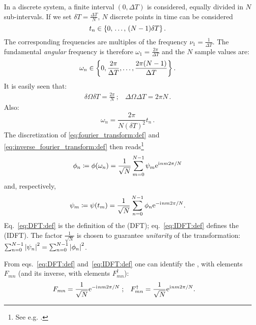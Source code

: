 In a discrete system, a finite interval $(0, \Delta{T})$ is considered,
equally divided in $N$ sub-intervals. If we set $\delta{T} = \frac{\Delta{T}}{N}$,
$N$ discrete points in time can be considered
\begin{equation}\label{eq:DFT:t_spectrum}
  t_n \in \left\{0,\,\hdots,\,(N-1)\delta{T}\right\} \text{.}
\end{equation}
%
The corresponding frequencies are multiples of the  frequency $\nu_1 = \frac{1}{\Delta{T}}$.
The fundamental \emph{angular} frequency is therefore $\omega_1 = \frac{2\pi}{\Delta{T}}$ and the
$N$ sample values are:
\begin{equation}\label{eq:DFT:omega_spectrum}
  \omega_n \in \left\{0, \frac{2\pi}{\Delta{T}}, \dots, \frac{2\pi(N-1)}{\Delta{T}}\right\} \text{.}
\end{equation}
%
It is easily seen that:
\begin{gather}\label{eq:DFT:deltas}
  \delta\Omega \delta T = \frac{2\pi}{N} \, \text{;} \quad
  \Delta\Omega \Delta T = 2\pi N \, \text{.}
\end{gather}
Also:
\begin{equation}\label{eq:DFT:eigenratio}
  \omega_{n} = \frac{2\pi}{N(\delta{T})^{2}} t_{n}  \, \text{.}
\end{equation}
%
The discretization
of \eqref{eq:fourier_transform:def} and \eqref{eq:inverse_fourier_transform:def}
then reads\footnote{
  See e.g.
  \cite{Oppenheim:Int1,Oppenheim:Int3,ProakisManolakis}.
}
\begin{equation}\label{eq:DFT:def}
  \phi_n \coloneqq \phi(\omega_n) = \frac{1}{\sqrt{N}} \sum_{m=0}^{N-1} \psi_m \mathrm{e}^{\mathrm{i}\mkern1mu n m 2 \pi / N}
\end{equation}
and, respectively,
\begin{equation}\label{eq:IDFT:def}
  \psi_m \coloneqq \psi(t_m) = \frac{1}{\sqrt{N}} \sum_{n=0}^{N-1} \phi_n \mathrm{e}^{-\mathrm{i}\mkern1mu n m 2 \pi / N} \text{.}
\end{equation}
%
Eq.~\eqref{eq:DFT:def} is the definition of the  (DFT);
eq.~\eqref{eq:IDFT:def} defines the  (IDFT).
%
The factor $\frac{1}{\sqrt{N}}$
is chosen to guarantee \emph{unitarity} of the transformation:
$\sum_{n=0}^{N-1} \abs{\psi_n}^2 = \sum_{n=0}^{N-1} \abs{\phi_n}^2$.

From eqs.~\eqref{eq:DFT:def} and~\eqref{eq:IDFT:def} one can identify the
, with elements $F_{mn}$
(and its inverse,
with elements $F_{mn}^{\dagger}$):
\begin{align}
  F_{mn}            &= \frac{1}{\sqrt{N}} \mathrm{e}^{-\mathrm{i}\mkern1mu n m 2 \pi / N} \;\text{;} &
  F_{mn}^{\dagger}  &= \frac{1}{\sqrt{N}} \mathrm{e}^{ \mathrm{i}\mkern1mu n m 2 \pi / N}
  \text{.}
\end{align}


